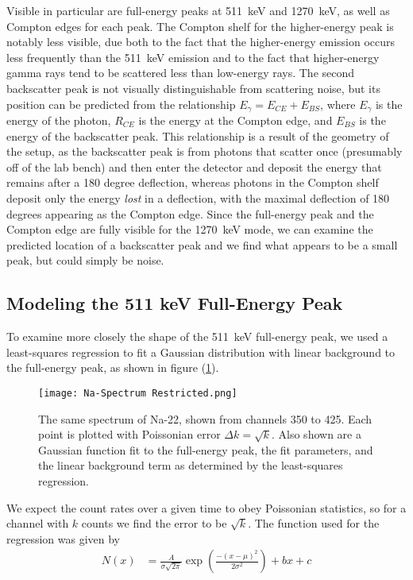 \documentclass[letter]{article}
\begin{document}
 Visible in particular are full-energy peaks at \qty{511}{\kilo\electronvolt} and \qty{1270}{\kilo\electronvolt}, as well as Compton edges for each peak. The Compton shelf for the higher-energy peak is notably less visible, due both to the fact that the higher-energy emission occurs less frequently than the \qty{511}{\kilo\electronvolt} emission and to the fact that higher-energy gamma rays tend to be scattered less than low-energy rays. The second backscatter peak is not visually distinguishable from scattering noise, but its position can be predicted from the relationship $E_\gamma = E_{CE} + E_{BS}$, where $E_\gamma$ is the energy of the photon, $R_{CE}$ is the energy at the Compton edge, and $E_{BS}$ is the energy of the backscatter peak. This relationship is a result of the geometry of the setup, as the backscatter peak is from photons that scatter once (presumably off of the lab bench) and then enter the detector and deposit the energy that remains after a 180 degree deflection, whereas photons in the Compton shelf deposit only the energy \textit{lost} in a deflection, with the maximal deflection of 180 degrees appearing as the Compton edge. Since the full-energy peak and the Compton edge are fully visible for the \qty{1270}{\kilo\electronvolt} mode, we can examine the predicted location of a backscatter peak and we find what appears to be a small peak, but could simply be noise. 

\subsection{Modeling the 511 keV Full-Energy Peak}

To examine more closely the shape of the \qty{511}{\kilo\electronvolt} full-energy peak, we used a least-squares regression to fit a Gaussian distribution with linear background to the full-energy peak, as shown in figure (\ref{fig:NaSpecRestr}).

\begin{figure}[h] \centering
    \texttt{[image: Na-Spectrum Restricted.png]}
    \caption{The same spectrum of Na-22, shown from channels 350 to 425. Each point is plotted with Poissonian error $\Delta k = \sqrt{k}$. Also shown are a Gaussian function fit to the full-energy peak, the fit parameters, and the linear background term as determined by the least-squares regression.}
    \label{fig:NaSpecRestr}
\end{figure}

We expect the count rates over a given time to obey Poissonian statistics, so for a channel with $k$ counts we find the error to be $\sqrt{k}$. The function used for the regression was given by
\begin{align}
N(x)
&=
\frac{A}{\sigma \sqrt{2 \pi}} \exp \left( \frac{- (x-\mu)^2}{2 \sigma^2} \right) + bx + c
\end{align}
\end{document}
